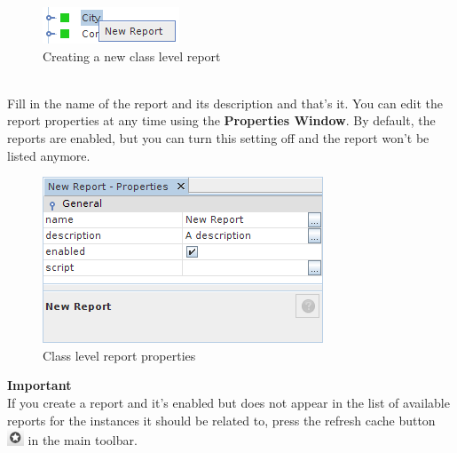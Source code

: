 \documentclass[a4paper]{article}
\begin{document}
			\begin{figure}[h!]
				\centering
				\includegraphics[scale=0.8]{img/reports_new_report.png}
				\caption{Creating a new class level report}
				\label{fig:reports_new_report}
			\end{figure}\\
			Fill in the name of the report and its description and that's it. You can edit the report properties at any time using the \textbf{Properties Window}. By default, the reports are enabled, but you can turn this setting off and the report won't be listed anymore.
			\begin{figure}[h!]
				\centering
				\includegraphics[scale=0.8]{img/reports_report_properties.png}
				\caption{Class level report properties}
				\label{fig:reports_report_properties}
			\end{figure}
			\begin{framed} {\large \textbf{Important}}\\
				If you create a report and it's enabled but does not appear in the list of available reports for the instances it should be related to, press the refresh cache button \includegraphics[width=0.5cm]{img/icon_refresh_cache.png} in the main toolbar.
			\end{framed}
\end{document}
